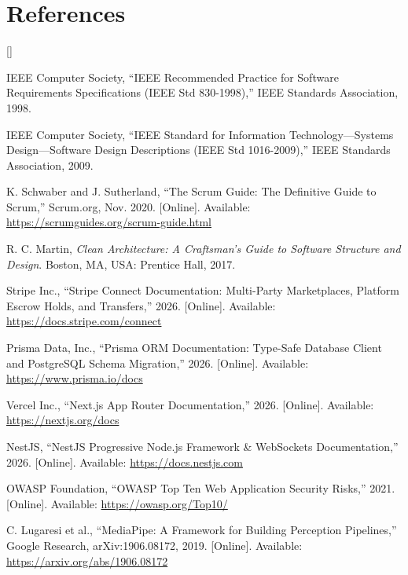 \part{References}

\begin{list}{[]}{\leftmargin=1.2cm\itemsep=6pt\parsep=0pt}
    \item IEEE Computer Society, ``IEEE Recommended Practice for Software Requirements Specifications (IEEE Std 830-1998),'' IEEE Standards Association, 1998.

    \item IEEE Computer Society, ``IEEE Standard for Information Technology---Systems Design---Software Design Descriptions (IEEE Std 1016-2009),'' IEEE Standards Association, 2009.

    \item K. Schwaber and J. Sutherland, ``The Scrum Guide: The Definitive Guide to Scrum,'' Scrum.org, Nov. 2020. [Online]. Available: \url{https://scrumguides.org/scrum-guide.html}

    \item R. C. Martin, \textit{Clean Architecture: A Craftsman's Guide to Software Structure and Design}. Boston, MA, USA: Prentice Hall, 2017.

    \item Stripe Inc., ``Stripe Connect Documentation: Multi-Party Marketplaces, Platform Escrow Holds, and Transfers,'' 2026. [Online]. Available: \url{https://docs.stripe.com/connect}

    \item Prisma Data, Inc., ``Prisma ORM Documentation: Type-Safe Database Client and PostgreSQL Schema Migration,'' 2026. [Online]. Available: \url{https://www.prisma.io/docs}

    \item Vercel Inc., ``Next.js App Router Documentation,'' 2026. [Online]. Available: \url{https://nextjs.org/docs}

    \item NestJS, ``NestJS Progressive Node.js Framework \& WebSockets Documentation,'' 2026. [Online]. Available: \url{https://docs.nestjs.com}

    \item OWASP Foundation, ``OWASP Top Ten Web Application Security Risks,'' 2021. [Online]. Available: \url{https://owasp.org/Top10/}

    \item C. Lugaresi et al., ``MediaPipe: A Framework for Building Perception Pipelines,'' Google Research, arXiv:1906.08172, 2019. [Online]. Available: \url{https://arxiv.org/abs/1906.08172}
\end{list}
